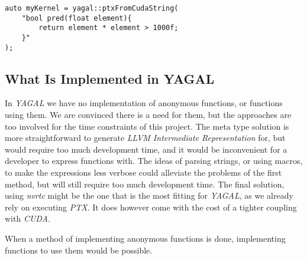 \begin{lstlisting}[caption={Code showing a possible construction of a device function based on a string. The string is being sent to the library, where it get extended to correct \textit{CUDA C}, before being sent to \textit{nvrtc}.}, label={code:metaBuildNvrtc}]
auto myKernel = yagal::ptxFromCudaString(
    "bool pred(float element){
        return element * element > 1000f;
    }"
);
\end{lstlisting}

\subsection{What Is Implemented in YAGAL}
In \textit{YAGAL} we have no implementation of anonymous functions, or functions using them. We are convinced there is a need for them, but the approaches are too involved for the time constraints of this project. The meta type solution is more straightforward to generate \textit{LLVM Intermediate Representation} for, but would require too much development time, and it would be inconvenient for a developer to express functions with. The ideas of parsing strings, or using macros, to make the expressions less verbose could alleviate the problems of the first method, but will still require too much development time. The final solution, using \textit{nvrtc} might be the one that is the most fitting for \textit{YAGAL}, as we already rely on executing \textit{PTX}. It does however come with the cost of a tighter coupling with \textit{CUDA}.

When a method of implementing anonymous functions is done, implementing functions to use them would be possible.